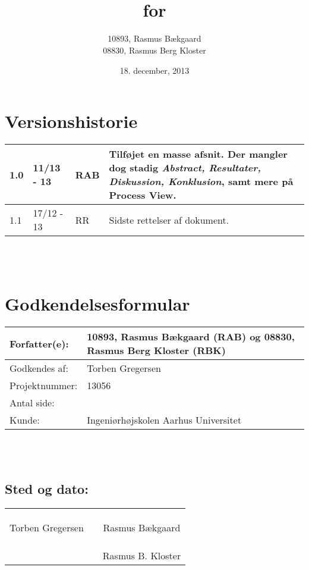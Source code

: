 \documentclass[oneside, 12pt]{memoir}
\title{\DocumentType \\ for \\ \ProjectName}
\date{18. december, 2013}
\author{10893, Rasmus Bækgaard\\08830, Rasmus Berg Kloster}
\begin{document}
\begin{titlingpage} 
  \maketitle
\end{titlingpage}


\section*{Versionshistorie}
\begin{tabular}{p{}|p{}|p{}|p{}}
\hline 1.0 & 11/13 - 13 & RAB & Tilføjet en masse afsnit. Der mangler dog stadig \textit{Abstract,  Resultater, Diskussion, Konklusion}, samt mere på Process View. 
\\ \hline 
1.1 & 17/12 - 13 & RR & Sidste rettelser af dokument.
\\ \hline 
\end{tabular} 
\\
\\
\section*{Godkendelsesformular}
\begin{tabular}{p{}|p{}}
\hline 
Forfatter(e): & 10893, Rasmus Bækgaard (RAB) og 08830, Rasmus Berg Kloster (RBK)\\ 
\hline 
Godkendes af: & Torben Gregersen \\ 
\hline
Projektnummer: & 13056\\
\hline
Antal side: & \pageref{LastPage} \\
\hline 
Kunde: & Ingeniørhøjskolen Aarhus Universitet \\
\hline
\end{tabular} 
\\
\\
\subsection*{Sted og dato:}
\begin{tabular}{c p{} c}
&& \\
&& \\
\underline{\qquad \qquad \qquad \qquad \qquad \qquad \qquad} & \qquad & \underline{\qquad \qquad \qquad \qquad \qquad \qquad \qquad}  \\ 
Torben Gregersen & & Rasmus Bækgaard \\ \\\\
&&  \underline{\qquad \qquad \qquad \qquad \qquad \qquad \qquad}  \\
& & Rasmus B. Kloster
\end{tabular} 
\end{document}
